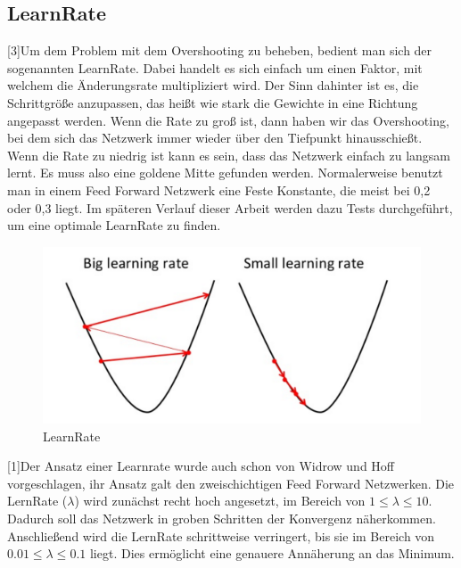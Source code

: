 \documentclass[12pt]{article}
\begin{document}
\subsection{LearnRate}[3]Um dem Problem mit dem Overshooting zu beheben, bedient man sich der sogenannten LearnRate. Dabei handelt es sich einfach um einen Faktor, mit welchem die Änderungsrate multipliziert wird. Der Sinn dahinter ist es, die Schrittgröße anzupassen, das heißt wie stark die Gewichte in eine Richtung angepasst werden. Wenn die Rate zu groß ist, dann haben wir das Overshooting, bei dem sich das Netzwerk immer wieder über den Tiefpunkt hinausschießt. Wenn die Rate zu niedrig ist kann es sein, dass das Netzwerk einfach zu langsam lernt. Es muss also eine goldene Mitte gefunden werden. Normalerweise benutzt man in einem Feed Forward Netzwerk eine Feste Konstante, die meist bei 0,2 oder 0,3 liegt. Im späteren Verlauf dieser Arbeit werden dazu Tests durchgeführt, um eine optimale LearnRate zu finden.
\begin{figure}[H]
\centering
\includegraphics[scale=0.250]{./Images/Pasted image 20230917181526.png}
\caption{LearnRate}
\label{LearnRate}
\end{figure}
[1]Der Ansatz einer Learnrate wurde auch schon von Widrow und Hoff vorgeschlagen, ihr Ansatz galt den zweischichtigen Feed Forward Netzwerken. Die LernRate ($\lambda$) wird zunächst recht hoch angesetzt, im Bereich von $1 \le \lambda \le 10$. Dadurch soll das Netzwerk in groben Schritten der Konvergenz näherkommen. Anschließend wird die LernRate schrittweise verringert, bis sie im Bereich von $0.01 \le \lambda \le 0.1$ liegt. Dies ermöglicht eine genauere Annäherung an das Minimum.
\end{document}
